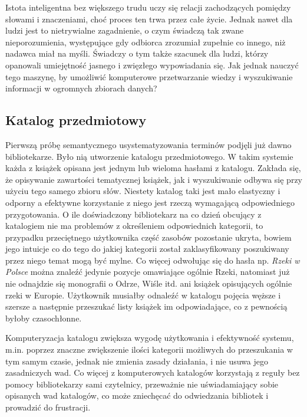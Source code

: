 \documentclass[12pt,a4paper,notitlepage]{article}
\begin{document}
Istota inteligentna bez większego trudu uczy się relacji zachodzących pomiędzy słowami i znaczeniami, choć proces ten trwa przez całe życie. Jednak nawet dla ludzi jest to nietrywialne zagadnienie, o czym świadczą tak zwane nieporozumienia, występujące gdy odbiorca zrozumiał zupełnie co innego, niż nadawca miał na myśli. Świadczy o tym także szacunek dla ludzi, którzy opanowali umiejętność jasnego i zwięzłego wypowiadania się. Jak jednak nauczyć tego maszynę, by umożliwić komputerowe przetwarzanie wiedzy i wyszukiwanie informacji w ogromnych zbiorach danych?

\subsection{Katalog przedmiotowy}
Pierwszą próbę semantycznego usystematyzowania terminów podjęli już dawno bibliotekarze. Było nią utworzenie katalogu przedmiotowego. W takim systemie każda z książek opisana jest jednym lub wieloma hasłami z katalogu. Zakłada się, że opisywanie zawartości tematycznej książek, jak i wyszukiwanie odbywa się przy użyciu tego samego zbioru słów. Niestety katalog taki jest mało elastyczny i odporny a efektywne korzystanie z niego jest rzeczą wymagającą odpowiedniego przygotowania. O ile doświadczony bibliotekarz na co dzień obcujący z katalogiem nie ma problemów z określeniem odpowiednich kategorii, to przypadku przeciętnego użytkownika część zasobów pozostanie ukryta, bowiem jego intuicje co do tego do jakiej kategorii został zaklasyfikowany poszukiwany przez niego temat mogą być mylne. Co więcej odwołując się do hasła np. \textit{Rzeki w Polsce} można znaleźć jedynie pozycje omawiające ogólnie Rzeki, natomiast już nie odnajdzie się monografii o Odrze, Wiśle itd. ani książek opisujących ogólnie rzeki w Europie. Użytkownik musiałby odnaleźć w katalogu pojęcia węższe i szersze a następnie przeszukać listy książek im odpowiadające, co z pewnością byłoby czasochłonne.  

Komputeryzacja katalogu zwiększa wygodę użytkowania i efektywność systemu, m.in. poprzez znaczne zwiększenie ilości kategorii możliwych do przeszukania w tym samym czasie, jednak nie zmienia zasady działania, i nie usuwa jego zasadniczych wad. Co więcej z komputerowych katalogów korzystają z reguły bez pomocy bibliotekarzy sami czytelnicy, przeważnie nie uświadamiający sobie opisanych wad katalogów, co może zniechęcać do odwiedzania bibliotek i prowadzić do frustracji.
\end{document}
